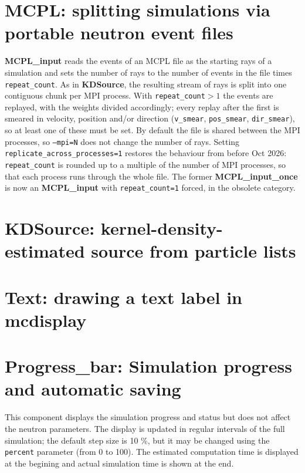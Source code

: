 \section{MCPL: splitting simulations via portable neutron event files}
\label{s:mcpl}
\textbf{MCPL\_input} reads the events of an MCPL file as the starting
rays of a simulation and sets the number of rays to the number of events
in the file times \texttt{repeat\_count}. As in \textbf{KDSource}, the
resulting stream of rays is split into one contiguous chunk per MPI
process. With \texttt{repeat\_count}$>1$ the events are replayed, with the
weights divided accordingly; every replay after the first is smeared in
velocity, position and/or direction (\texttt{v\_smear},
\texttt{pos\_smear}, \texttt{dir\_smear}), so at least one of these must
be set. By default the file is shared between the MPI processes, so
\texttt{--mpi=N} does not change the number of rays. Setting
\texttt{replicate\_across\_processes=1} restores the behaviour from before
Oct 2026: \texttt{repeat\_count} is rounded up to a multiple of the number
of MPI processes, so that each process runs through the whole file.
The former \textbf{MCPL\_input\_once} is now an \textbf{MCPL\_input}
with \texttt{repeat\_count=1} forced, in the obsolete category.





\newpage
\section{KDSource: kernel-density-estimated source from particle lists}
\label{s:kdsource}


\newpage
\section{Text: drawing a text label in mcdisplay}
\label{s:text-comp}


\newpage
\section{Progress\_bar: Simulation progress and automatic saving}
\label{s:progress-bar}

This component displays the simulation progress and status
but does not affect the neutron parameters.
The display is updated in regular intervals of the full simulation;
the default step size is 10 \%, but it may be changed using
the \verb+percent+ parameter (from 0 to 100).
The estimated computation time is displayed at the begining
and actual simulation time is shown at the end.

